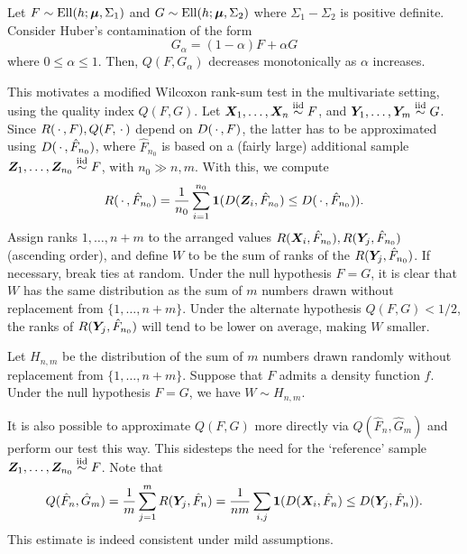 \begin{proposition}
    Let $F \sim \operatorname{Ell}(h; \bm{\mu}, \Sigma_1)$ and $G \sim \operatorname{Ell}(h; \bm{\mu},
    \Sigma_2)$ where $\Sigma_1 - \Sigma_2$ is positive definite.
    Consider Huber's contamination of the form
    \begin{equation}
        G_\alpha = (1 - \alpha)F + \alpha G
    \end{equation}
    where $0 \leq \alpha \leq 1$.
    Then, $Q(F, G_\alpha)$ decreases monotonically as $\alpha$ increases.
\end{proposition}

This motivates a modified Wilcoxon rank-sum test in the multivariate setting,
using the quality index $Q(F, G)$.
Let $\bm{X}_1, \dots, \bm{X}_n \overset{\text{iid}}{\sim} F$, and $\bm{Y}_1, \dots, \bm{Y}_m \overset{\text{iid}}{\sim} G$.
Since $R(\,\cdot\,, F), Q(F, \,\cdot\,)$ depend on $D(\,\cdot\,, F)$, the latter has to be
approximated using $D(\,\cdot\,, \hat{F}_{n_0})$, where $\hat{F}_{n_0}$ is based
on a (fairly large) additional sample $\bm{Z}_1, \dots, \bm{Z}_{n_0} \overset{\text{iid}}{\sim} F$, with
$n_0 \gg n, m$.
With this, we compute
\begin{equation}
    R(\,\cdot\,, \hat{F}_{n_0}) = \frac{1}{n_0} \sum_{i = 1}^{n_0} \bm{1}(D(\bm{Z}_i, \hat{F}_{n_0}) \leq D(\,\cdot\,, \hat{F}_{n_0})).
\end{equation}
Assign ranks $1, \dots, n + m$ to the arranged values $R(\bm{X}_i,
\hat{F}_{n_0}), R(\bm{Y}_j, \hat{F}_{n_0})$ (ascending order), and define $W$ to
be the sum of ranks of the $R(\bm{Y}_j, \hat{F}_{n_0})$.
If necessary, break ties at random.
Under the null hypothesis $F = G$, it is clear that $W$ has the same
distribution as the sum of $m$ numbers drawn without replacement from $\{1,
\dots, n + m\}$.
Under the alternate hypothesis $Q(F, G) < 1/2$, the ranks of $R(\bm{Y}_j,
\hat{F}_{n_0})$ will tend to be lower on average, making $W$ smaller.

\begin{theorem}
    Let $H_{n, m}$ be the distribution of the sum of $m$ numbers drawn
    randomly without replacement from $\{1, \dots, n + m\}$.
    Suppose that $F$ admits a density function $f$.
    Under the null hypothesis $F = G$, we have $W \sim H_{n, m}$.
\end{theorem}

It is also possible to approximate $Q(F, G)$ more directly via $Q(\hat{F}_n,
\hat{G}_m)$ and perform our test this way.
This sidesteps the need for the `reference' sample $\bm{Z}_1, \dots, \bm{Z}_{n_0}
\overset{\text{iid}}{\sim} F$.
Note that
\begin{equation}
    Q(\hat{F}_n, \hat{G}_m)
    = \frac{1}{m}\sum_{j = 1}^m R(\bm{Y}_j, \hat{F}_n)
    = \frac{1}{nm}\sum_{i, j} \bm{1}(D(\bm{X}_i, \hat{F}_n) \leq D(\bm{Y}_j, \hat{F}_n)).
\end{equation}
This estimate is indeed consistent under mild assumptions.

